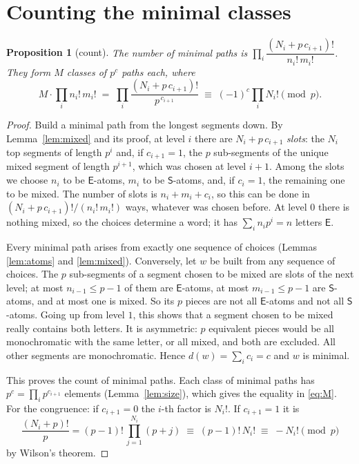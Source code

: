 \documentclass[11pt]{article}
\newtheorem{proposition}[theorem]{Proposition}
\theoremstyle{definition}
\theoremstyle{remark}
\newcommand{\E}{\textsf{E}}
\newcommand{\Ss}{\textsf{S}}
\begin{document}
\section{Counting the minimal classes}\label{sec:count}

\begin{proposition}[count]\label{prop:count}
The number of minimal paths is $\prod_i\dfrac{(N_i+p\,c_{i+1})!}{n_i!\,m_i!}$. They form $M$ classes of $p^c$
paths each, where
\begin{equation}\label{eq:M}
M\cdot\prod_i n_i!\,m_i!\;=\;\prod_i\frac{(N_i+p\,c_{i+1})!}{p^{\,c_{i+1}}}\;\equiv\;(-1)^c\prod_iN_i!\pmod p .
\end{equation}
\end{proposition}
\begin{proof}
Build a minimal path from the longest segments down. By Lemma~\ref{lem:mixed} and its proof, at level $i$ there are
$N_i+p\,c_{i+1}$ \emph{slots}: the $N_i$ top segments of length $p^i$ and, if $c_{i+1}=1$, the $p$ sub-segments of
the unique mixed segment of length $p^{i+1}$, which was chosen at level $i+1$. Among the slots we choose $n_i$
to be $\E$-atoms, $m_i$ to be $\Ss$-atoms, and, if $c_i=1$, the remaining one to be mixed. The number of slots is
$n_i+m_i+c_i$, so this can be done in $(N_i+p\,c_{i+1})!/(n_i!\,m_i!)$ ways, whatever was chosen before.
At level $0$ there is nothing mixed, so the choices determine a word; it has $\sum_in_ip^i=n$ letters $\E$.

Every minimal path arises from exactly one sequence of choices (Lemmas \ref{lem:atoms} and \ref{lem:mixed}).
Conversely, let $w$ be built from any sequence of choices. The $p$ sub-segments of a segment chosen to be mixed
are slots of the next level; at most $n_{i-1}\le p-1$ of them are $\E$-atoms, at most $m_{i-1}\le p-1$ are
$\Ss$-atoms, and at most one is mixed. So its $p$ pieces are not all $\E$-atoms and not all $\Ss$-atoms. Going up from level $1$, this shows that a
segment chosen to be mixed really contains both letters. It is asymmetric: $p$ equivalent pieces
would be all monochromatic with the same letter, or all mixed, and both are excluded. All other segments are
monochromatic. Hence
$d(w)=\sum_ic_i=c$ and $w$ is minimal.

This proves the count of minimal paths. Each class of minimal paths has $p^c=\prod_ip^{c_{i+1}}$ elements
(Lemma~\ref{lem:size}), which gives the equality in \eqref{eq:M}. For the congruence: if $c_{i+1}=0$ the $i$-th
factor is $N_i!$. If $c_{i+1}=1$ it is
\[
\frac{(N_i+p)!}{p}=(p-1)!\,\prod_{j=1}^{N_i}(p+j)\;\equiv\;(p-1)!\,N_i!\;\equiv\;-N_i!\pmod p
\]
by Wilson's theorem.
\end{proof}
\end{document}
